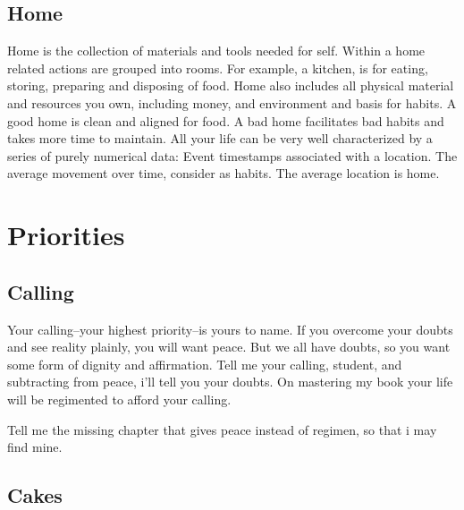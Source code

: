 \documentclass[
]{book}
\begin{document}
\hypertarget{home}{%
\section{Home}\label{home}}

Home is the collection of materials and tools needed for self.
Within a home related actions are grouped into rooms.
For example, a kitchen, is for eating, storing, preparing and disposing of food.
Home also includes all physical material and resources you own, including money, and environment and basis for habits.
A good home is clean and aligned for food.
A bad home facilitates bad habits and takes more time to maintain.
All your life can be very well characterized by a series of purely numerical data:
Event timestamps associated with a location.
The average movement over time, consider as habits.
The average location is home.

\hypertarget{priorities}{%
\chapter{Priorities}\label{priorities}}

\hypertarget{calling}{%
\section{Calling}\label{calling}}

Your calling--your highest priority--is yours to name.
If you overcome your doubts and see reality plainly, you will want peace.
But we all have doubts, so you want some form of dignity and affirmation.
Tell me your calling, student, and subtracting from peace, i'll tell you your doubts.
On mastering my book your life will be regimented to afford your calling.

Tell me the missing chapter that gives peace instead of regimen, so that i may find mine.

\hypertarget{cakes}{%
\section{Cakes}\label{cakes}}
\end{document}
